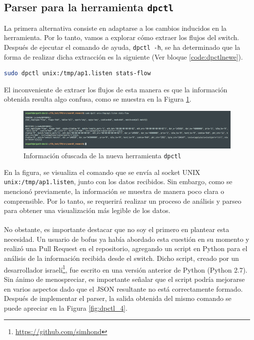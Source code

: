 \subsection{Parser para la herramienta \texttt{dpctl}}

La primera alternativa consiste en adaptarse a los cambios inducidos en la herramienta. Por lo tanto, vamos a explorar cómo extraer los flujos del switch. Después de ejecutar el comando de ayuda, \texttt{dpctl -h}, se ha determinado que la forma de realizar dicha extracción es la siguiente (Ver bloque \ref{code:dpctlnewe}).

\begin{lstlisting}[language= bash, style=Consola, caption={Extracción de flujos con la nueva versión de dpctl},label=code:dpctlnewe]
    sudo dpctl unix:/tmp/ap1.listen stats-flow
\end{lstlisting}
\vspace{0.5cm}

El inconveniente de extraer los flujos de esta manera es que la información obtenida resulta algo confusa, como se muestra en la Figura \ref{fig:dpctl_3}.

\begin{figure}[ht]
    \centering
    \includegraphics[width=\textwidth]{archivos/img/dev/dpctl_3.png}
    \caption{Información ofuscada de la nueva herramienta \texttt{dpctl}}
    \label{fig:dpctl_3}
\end{figure}

En la figura, se visualiza el comando que se envía al socket UNIX \texttt{unix:/tmp/ap1.listen}, junto con los datos recibidos. Sin embargo, como se mencionó previamente, la información se muestra de manera poco clara o comprensible. Por lo tanto, se requerirá realizar un proceso de análisis y parseo para obtener una visualización más legible de los datos.\\
\\
No obstante, es importante destacar que no soy el primero en plantear esta necesidad. Un usuario de \gls{bofus} ya había abordado esta cuestión en su momento y realizó una Pull Request en el repositorio, agregando un script en Python para el análisis de la información recibida desde el switch. Dicho script, creado por un desarrollador israelí\footnote{\url{https://github.com/simhond}}, fue escrito en una versión anterior de Python (Python 2.7). Sin ánimo de menospreciar, es importante señalar que el script podría mejorarse en varios aspectos dado que el JSON resultante no está correctamente formado. Después de implementar el parser, la salida obtenida del mismo comando se puede apreciar en la Figura \ref{fig:dpctl_4}.


